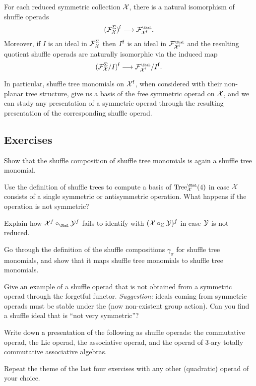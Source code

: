 \begin{corollary}
For each reduced symmetric collection $\mathcal{X}$, 
there is a natural isomorphism of shuffle operads
\[
(\FF_\XX^\Sigma)^{\f}
 \longrightarrow \FF_{\XX^{\f}}^\Sha.
\]
Moreover, if $I$ is an ideal in $\mathcal{F}_{\mathcal{X}}^\Sigma$
then $I^{\mathsf{f}}$ is an ideal in $\FF_{\XX^\f}^\Sha$ and the
resulting quotient shuffle operads are naturally
isomorphic via the induced map
\[
(\FF_\XX^\Sigma/ I )^{\f}
 \longrightarrow \FF_{\XX^{\f}}^\Sha/ I^\f.
\]
\end{corollary}

In particular, shuffle tree monomials on $\mathcal{X}^{\mathsf{f}}$, when
considered with their non-planar tree structure,
give us a basis of the free symmetric operad on 
$\mathcal{X}$, and we can study any presentation of a symmetric
operad through the resulting presentation of the
corresponding shuffle operad. 

\subsection{Exercises}

\begin{question}\label{ex:shufflecomp}
 Show that the shuffle composition of shuffle tree
monomials is again a shuffle tree
monomial.
\end{question}
 
\begin{question}
Use the definition of shuffle trees
to compute a basis
of $\mathrm{Tree}_\XX^\Sha(4)$ in case $\mathcal{X}$ consists
of a single symmetric or antisymmetric
operation. What happens if the operation
is not symmetric?
\end{question}

\begin{question} Explain how 
$\XX^f \circ_\Sha \YY^f$ fails
 to identify with  $(\mathcal{X}\circ_\Sigma \mathcal{Y})^f$ 
 in case $\mathcal{Y}$ is
 not reduced. 
\end{question}

\begin{question}
Go through the definition of the shuffle
compositions $\gamma_\pi$ for shuffle
tree monomials, and show that it maps
shuffle tree monomials to shuffle tree
monomials.
\end{question}

\begin{question} 
Give an example of a shuffle operad that
is not obtained from a symmetric operad
through the forgetful functor. \emph{Suggestion:}
ideals coming from symmetric operads must be
stable under the (now non-existent group action).
Can you find a shuffle ideal that is ``not very
symmetric''?
\end{question}

\begin{question}
Write down a presentation of the following as
shuffle operads: the  
commutative operad, the
Lie operad, the
associative operad, and the
operad of $3$-ary totally commutative
associative algebras.
\end{question}

\begin{question}
Repeat the theme of the last four exercises
with any other (quadratic) operad
of your choice.
\end{question}